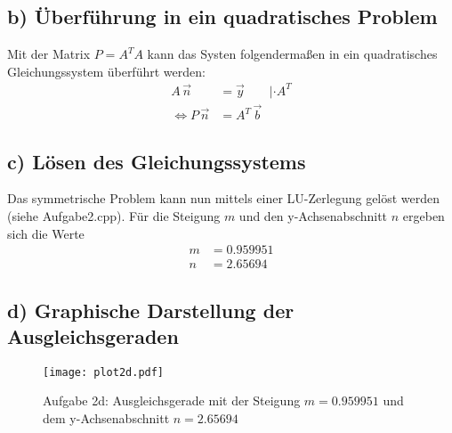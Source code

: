 \subsection*{b) Überführung in ein quadratisches Problem}

Mit der Matrix $P = A^{T}A$ kann das Systen folgendermaßen in ein quadratisches Gleichungssystem überführt werden:
\begin{align*}
  A\,\vec{n}&=\vec{y} \qquad |\cdot A^{T} \\
\Leftrightarrow  P\,\vec{n}&=A^{T}\,\vec{b}
\end{align*}

\subsection*{c) Lösen des Gleichungssystems}
Das symmetrische Problem kann nun mittels einer LU-Zerlegung gelöst werden (siehe Aufgabe2.cpp).
Für die Steigung $m$ und den y-Achsenabschnitt $n$ ergeben sich die Werte
\begin{align*}
  m&=0.959951\\
  n&=2.65694
\end{align*}

\subsection*{d) Graphische Darstellung der Ausgleichsgeraden}

\FloatBarrier
\begin{figure}[h]
    \centering
    \texttt{[image: plot2d.pdf]}
    \caption{Aufgabe 2d: Ausgleichsgerade mit der Steigung $m=0.959951$ und dem y-Achsenabschnitt $n=2.65694$}
    \label{fig:plot2b}
\end{figure}
\FloatBarrier



